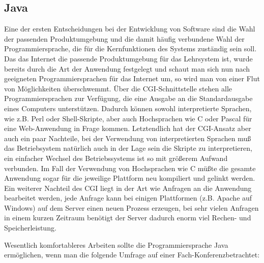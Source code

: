 \subsection{Java}
Eine der ersten Entscheidungen bei der Entwicklung von Software sind die Wahl der passenden
Produktumgebung und die damit h\"aufig verbundene Wahl der Programmiersprache, die f\"ur
die Kernfunktionen des Systems zust\"andig sein soll. Das das Internet die passende Produktumgebung f\"ur
das Lehrsystem ist, wurde bereits durch die Art der Anwendung festgelegt und schaut man sich nun nach
geeigneten Programmiersprachen f\"ur das Internet um, so wird man von einer Flut von M\"oglichkeiten
\"uberschwemmt. \"Uber die CGI-Schnittstelle stehen alle Programmiersprachen zur Verf\"ugung, die
eine Ausgabe an die Standardausgabe eines Computers unterst\"utzen. Dadurch k\"onnen sowohl
interpretierte Sprachen, wie z.B. Perl oder Shell-Skripte, aber auch Hochsprachen wie C oder Pascal
f\"ur eine Web-Anwendung in Frage kommen. Letztendlich hat der CGI-Ansatz aber auch ein paar Nachteile,
bei der Verwendung von interpretierten Sprachen mu{\ss} das Betriebsystem nat\"urlich auch in der
Lage sein die Skripte zu interpretieren, ein einfacher Wechsel des Betriebssystems ist so mit gr\"o{\ss}erem
Aufwand verbunden. Im Fall der Verwendung von Hochsprachen wie C m\"u{\ss}te die gesamte Anwendung sogar
f\"ur die jeweilige Plattform neu kompiliert und gelinkt werden. Ein weiterer Nachteil des CGI liegt
in der Art wie Anfragen an die Anwendung bearbeitet werden, jede Anfrage kann bei einigen Plattformen (z.B.
Apache auf Windows) auf dem Server einen neuen Prozess erzeugen, bei sehr vielen Anfragen in einem 
kurzen Zeitraum ben\"otigt der Server dadurch enorm viel Rechen- und Speicherleistung.

Wesentlich komfortableres Arbeiten sollte die Programmiersprache Java erm\"oglichen, wenn man die
folgende Umfrage auf einer Fach-Konferenz\footnotemark[1] betrachtet:

